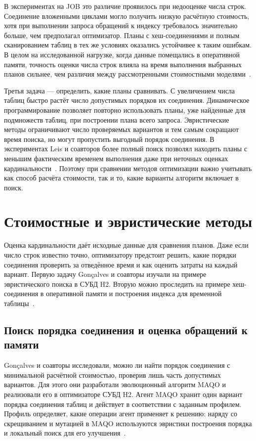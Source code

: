 \documentclass[a4paper, final]{article}
\begin{document}
	В экспериментах на JOB это различие проявилось при недооценке числа строк. Соединение вложенными циклами могло получить низкую расчётную стоимость, хотя при выполнении запроса обращений к индексу требовалось значительно больше, чем предполагал оптимизатор. Планы с хеш-соединениями и полным сканированием таблиц в тех же условиях оказались устойчивее к таким ошибкам. В целом на исследованной нагрузке, когда данные помещались в оперативной памяти, точность оценки числа строк влияла на время выполнения выбранных планов сильнее, чем различия между рассмотренными стоимостными моделями~\cite{leis2015}.
	
	Третья задача --- определить, какие планы сравнивать. С увеличением числа таблиц быстро растёт число допустимых порядков их соединения. Динамическое программирование позволяет повторно использовать планы, уже найденные для подмножеств таблиц, при построении плана всего запроса. Эвристические методы ограничивают число проверяемых вариантов и тем самым сокращают время поиска, но могут пропустить выгодный порядок соединения. В экспериментах Leis и соавторов более полный поиск позволял находить планы с меньшим фактическим временем выполнения даже при неточных оценках кардинальности~\cite{leis2015}. Поэтому при сравнении методов оптимизации важно учитывать как способ расчёта стоимости, так и то, какие варианты алгоритм включает в поиск.
	
	
	\newpage
	\section{Стоимостные и эвристические методы}
	
	Оценка кардинальности даёт исходные данные для сравнения планов. Даже если число строк известно точно, оптимизатору предстоит решить, какие порядки соединения проверить за отведённое время и как оценить затраты на каждый вариант. Первую задачу Gonçalves и соавторы изучали на примере эвристического поиска в СУБД H2. Вторую можно проследить на примере хеш-соединения в оперативной памяти и построения индекса для временной таблицы~\cite{goncalves2014,manegold2000,rahman2026}.
	
	\subsection{Поиск порядка соединения и оценка обращений к памяти}
	
	Gonçalves и соавторы исследовали, можно ли найти порядок соединения с минимальной расчётной стоимостью, проверив лишь часть допустимых вариантов. Для этого они разработали эволюционный алгоритм MAQO и реализовали его в оптимизаторе СУБД H2. Агент MAQO хранит один вариант порядка соединения таблиц и действует в соответствии с заданным профилем. Профиль определяет, какие операции агент применяет к решению: наряду со скрещиванием и мутацией в MAQO используются эвристики построения порядка и локальный поиск для его улучшения~\cite{goncalves2014}.
	
\end{document}
